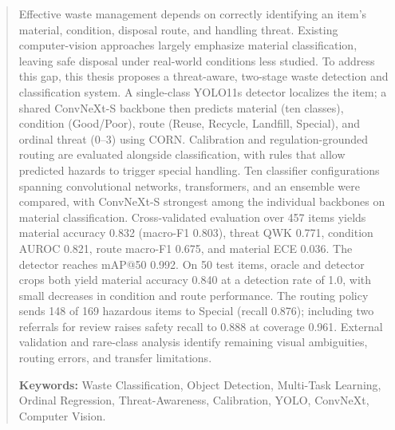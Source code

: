 \begin{abstract}
Effective waste management depends on correctly identifying an item's material, condition, disposal route, and handling threat. Existing computer-vision approaches largely emphasize material classification, leaving safe disposal under real-world conditions less studied. To address this gap, this thesis proposes a threat-aware, two-stage waste detection and classification system. A single-class YOLO11s detector localizes the item; a shared ConvNeXt-S backbone then predicts material (ten classes), condition (Good/Poor), route (Reuse, Recycle, Landfill, Special), and ordinal threat (0--3) using CORN. Calibration and regulation-grounded routing are evaluated alongside classification, with rules that allow predicted hazards to trigger special handling. Ten classifier configurations spanning convolutional networks, transformers, and an ensemble were compared, with ConvNeXt-S strongest among the individual backbones on material classification. Cross-validated evaluation over 457 items yields material accuracy 0.832 (macro-F1 0.803), threat QWK 0.771, condition AUROC 0.821, route macro-F1 0.675, and material ECE 0.036. The detector reaches mAP@50 0.992. On 50 test items, oracle and detector crops both yield material accuracy 0.840 at a detection rate of 1.0, with small decreases in condition and route performance. The routing policy sends 148 of 169 hazardous items to Special (recall 0.876); including two referrals for review raises safety recall to 0.888 at coverage 0.961. External validation and rare-class analysis identify remaining visual ambiguities, routing errors, and transfer limitations.

\textbf{Keywords:} Waste Classification, Object Detection, Multi-Task Learning, Ordinal Regression, Threat-Awareness, Calibration, YOLO, ConvNeXt, Computer Vision.
\end{abstract}
